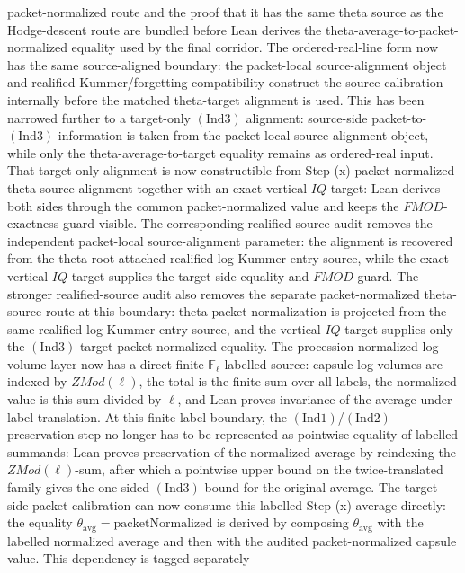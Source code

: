 \documentclass[11pt]{article}
\newcommand{\Lean}{Lean}
\newcommand{\Ind}{\ensuremath{\mathrm{Ind}}}
\theoremstyle{plain}
\theoremstyle{definition}
\theoremstyle{remark}
\begin{document}
packet-normalized route and the proof that it has the same theta source as the
Hodge-descent route are bundled before \Lean{} derives the
theta-average-to-packet-normalized equality used by the final corridor.
The ordered-real-line form now has the same source-aligned boundary: the
packet-local source-alignment object and realified Kummer/forgetting
compatibility construct the source calibration internally before the matched
theta-target alignment is used.
This has been narrowed further to a target-only \((\Ind3)\) alignment:
source-side packet-to-\((\Ind3)\) information is taken from the packet-local
source-alignment object, while only the theta-average-to-target equality
remains as ordered-real input.
That target-only alignment is now constructible from Step (x)
packet-normalized theta-source alignment together with an exact vertical-\(IQ\)
target: \Lean{} derives both sides through the common packet-normalized value
and keeps the \(FMOD\)-exactness guard visible.
The corresponding realified-source audit removes the independent
packet-local source-alignment parameter: the alignment is recovered from the
theta-root attached realified log-Kummer entry source, while the exact
vertical-\(IQ\) target supplies the target-side equality and \(FMOD\) guard.
The stronger realified-source audit also removes the separate
packet-normalized theta-source route at this boundary: theta packet
normalization is projected from the same realified log-Kummer entry source,
and the vertical-\(IQ\) target supplies only the \((\Ind3)\)-target
packet-normalized equality.
The procession-normalized log-volume layer now has a direct finite
\(\mathbb{F}_\ell\)-labelled source: capsule log-volumes are indexed by
\(ZMod(\ell)\), the total is the finite sum over all labels, the normalized
value is this sum divided by \(\ell\), and \Lean{} proves invariance of the
average under label translation.
At this finite-label boundary, the \((\Ind1)\)/\((\Ind2)\) preservation step no
longer has to be represented as pointwise equality of labelled summands:
\Lean{} proves preservation of the normalized average by reindexing the
\(ZMod(\ell)\)-sum, after which a pointwise upper bound on the twice-translated
family gives the one-sided \((\Ind3)\) bound for the original average.
The target-side packet calibration can now consume this labelled Step (x)
average directly: the equality
\(\theta_{\mathrm{avg}}=\mathrm{packetNormalized}\) is derived by composing
\(\theta_{\mathrm{avg}}\) with the labelled normalized average and then with the
audited packet-normalized capsule value.  This dependency is tagged separately
\end{document}

